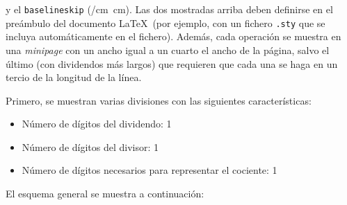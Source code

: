 \documentclass[svgnames,addpoints]{exam}
\makeatletter
\newlength{\zerowidth}
\newlength{\zeroheight}
\def\convertto#1#2{\strip@pt\dimexpr #2*65536/\number\dimexpr 1#1}
\makeatother
\begin{document}
\noindent
y el \texttt{baselineskip} (\convertto{cm}{\the\baselineskip}\
cm). Las dos mostradas arriba deben definirse en el preámbulo del
documento \LaTeX\ (por ejemplo, con un fichero \texttt{.sty} que se
incluya automáticamente en el fichero). Además, cada operación se
muestra en una \textit{minipage} con un ancho igual a un cuarto el
ancho de la página, salvo el último (con dividendos más largos) que
requieren que cada una se haga en un tercio de la longitud de la
línea.

\begin{questions}

  \question
  Primero, se muestran varias divisiones con las siguientes características:

  \begin{itemize}
    
  \item Número de dígitos del dividendo: 1
    
  \item Número de dígitos del divisor: 1
    
  \item Número de dígitos necesarios para representar el cociente: 1
    
  \end{itemize}

  El esquema general se muestra a continuación:

  \noindent\begin{minipage}{0.25\linewidth}
    \begin{center}
      \begin{tikzpicture}


        
        

\end{tikzpicture}
\end{center}
\end{minipage}
\end{questions}
\end{document}
